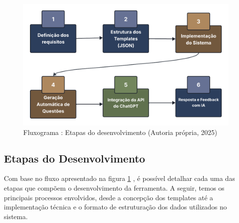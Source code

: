 \begin{figure}[ht]
	\centering
	\includegraphics[width=12cm]{./imagens/capitulo2/fluxograma}
	\caption{Fluxograma : Etapas do desenvolvimento (Autoria própria, 2025)}
	\label{fig:fluxo_desenvolvimento}
\end{figure}

\subsection{Etapas do Desenvolvimento}
Com base no fluxo apresentado na figura \ref{fig:fluxo_desenvolvimento} , é possível detalhar cada uma das etapas que compõem o desenvolvimento da ferramenta. A seguir, temos os principais processos envolvidos, desde a concepção dos templates até a implementação técnica e o formato de estruturação dos dados utilizados no sistema.

